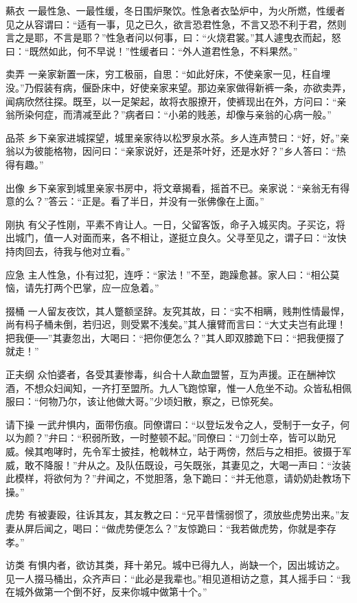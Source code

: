 \documentclass[12pt,UTF8]{ctexbook}
\begin{document}
爇衣
一最性急、一最性缓，冬日围炉聚饮。性急者衣坠炉中，为火所燃，性缓者见之从容谓曰：“适有一事，见之已久，欲言恐君性急，不言又恐不利于君，然则言之是耶，不言是耶？”性急者问以何事，曰：“火烧君裳。”其人遽曳衣而起，怒曰：“既然如此，何不早说！”性缓者曰：“外人道君性急，不料果然。”

卖弄
一亲家新置一床，穷工极丽，自思：“如此好床，不使亲家一见，枉自埋没。”乃假装有病，偃卧床中，好使亲家来望。那边亲家做得新裤一条，亦欲卖弄，闻病欣然往探。既至，以一足架起，故将衣服撩开，使裤现出在外，方问曰：“亲翁所染何症，而清减至此？”病者曰：“小弟的贱恙，却像与亲翁的心病一般。”

品茶
乡下亲家进城探望，城里亲家待以松罗泉水茶。乡人连声赞曰：“好，好。”亲翁以为彼能格物，因问曰：“亲家说好，还是茶叶好，还是水好？”乡人答曰：“热得有趣。”

出像
乡下亲家到城里亲家书房中，将文章揭看，摇首不已。亲家说：“亲翁无有得意的么？”答云：“正是。看了半日，并没有一张佛像在上面。”

刚执
有父子性刚，平素不肯让人。一日，父留客饭，命子入城买肉。子买讫，将出城门，值一人对面而来，各不相让，遂挺立良久。父寻至见之，谓子曰：“汝快持肉回去，待我与他对立看。”

应急
主人性急，仆有过犯，连呼：“家法！”不至，跑躁愈甚。家人曰：“相公莫恼，请先打两个巴掌，应一应急着。”

掇桶
一人留友夜饮，其人蹩额坚辞。友究其故，曰：“实不相瞒，贱荆性情最悍，尚有杩子桶未倒，若归迟，则受累不浅矣。”其人攘臂而言曰：“大丈夫岂有此理！把我便──”其妻忽出，大喝曰：“把你便怎么？”其人即双膝跪下曰：“把我便掇了就走！”

正夫纲
众怕婆者，各受其妻惨毒，纠合十人歃血盟誓，互为声援。正在酬神饮酒，不想众妇闻知，一齐打至盟所。九人飞跑惊窜，惟一人危坐不动。众皆私相佩服曰：“何物乃尔，该让他做大哥。”少顷妇散，察之，已惊死矣。

请下操
一武弁惧内，面带伤痕。同僚谓曰：“以登坛发令之人，受制于一女子，何以为颜？”弁曰：“积弱所致，一时整顿不起。”同僚曰：“刀剑士卒，皆可以助兄威。候其咆哮时，先令军士披挂，枪戟林立，站于两傍，然后与之相拒。彼摄于军威，敢不降服！”弁从之。及队伍既设，弓矢既张，其妻见之，大喝一声曰：“汝装此模样，将欲何为？”弁闻之，不觉胆落，急下跪曰：“并无他意，请奶奶赴教场下操。”

虎势
有被妻殴，往诉其友，其友教之曰：“兄平昔懦弱惯了，须放些虎势出来。”友妻从屏后闻之，喝曰：“做虎势便怎么？”友惊跪曰：“我若做虎势，你就是李存孝。”

访类
有惧内者，欲访其类，拜十弟兄。城中已得九人，尚缺一个，因出城访之。见一人掇马桶出，众齐声曰：“此必是我辈也。”相见道相访之意，其人摇手曰：“我在城外做第一个倒不好，反来你城中做第十个。”
\end{document}
